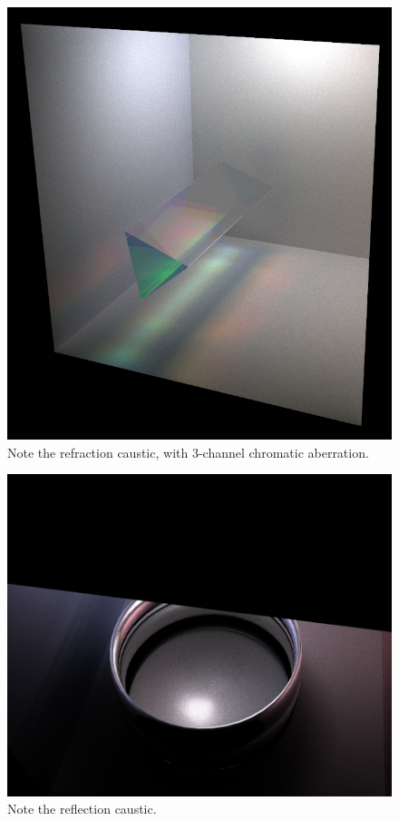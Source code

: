 \documentclass[12pt]{article}
\begin{document}
\begin{figure} 
\centering
  \includegraphics[width = 6 in]{v_rt_reflect_prism.png}
  \caption{ Note the refraction caustic, with 3-channel chromatic aberration.
}
\end{figure}


\begin{figure} 
\centering
  \includegraphics[width = 6 in]{v_rt_reflection_caustic.png}
  \caption{ Note the reflection caustic.
}
\end{figure}
\end{document}
